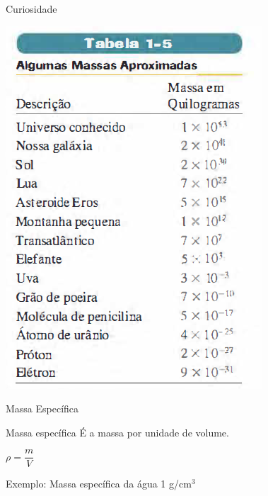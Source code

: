 \documentclass[xcolor=dvipsnames,table]{beamer}
\begin{document}
	\begin{frame}{Curiosidade}
		\begin{center}
			\includegraphics[scale=0.5]{images/tabela1-5.png}
		\end{center}
	\end{frame}	
	
	\begin{frame}{Massa Específica}
		\begin{block}{Massa específica}
			É a massa por unidade de volume.
			\begin{center}
				$\rho = \dfrac{m}{V}$
			\end{center}
		\end{block} \pause
		\begin{block}{Exemplo: Massa específica da água}
			1 g/$\mbox{cm}^3$
		\end{block}
	\end{frame}
	
\end{document}
